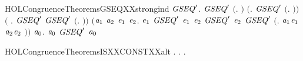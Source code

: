 \begin{SaveVerbatim}{HOLCongruenceTheoremsGSEQXXstrongind}
\HOLTokenTurnstile{} \HOLSymConst{\HOLTokenForall{}}\ensuremath{\HOLBoundVar{GSEQ}\sp{\prime}}.
       \ensuremath{\HOLBoundVar{GSEQ}\sp{\prime}} \ensuremath{(}\HOLTokenLambda{}. \ensuremath{)} \HOLSymConst{\HOLTokenConj{}} \ensuremath{(}\HOLSymConst{\HOLTokenForall{}}. \ensuremath{\HOLBoundVar{GSEQ}\sp{\prime}} \ensuremath{(}\HOLTokenLambda{}. \ensuremath{)}\ensuremath{)} \HOLSymConst{\HOLTokenConj{}}
       \ensuremath{(}\HOLSymConst{\HOLTokenForall{}} .   \HOLSymConst{\HOLTokenConj{}} \ensuremath{\HOLBoundVar{GSEQ}\sp{\prime}}  \HOLSymConst{\HOLTokenImp{}} \ensuremath{\HOLBoundVar{GSEQ}\sp{\prime}} \ensuremath{(}\HOLTokenLambda{}. \HOLSymConst{\ensuremath{\ldotp}} \ensuremath{)}\ensuremath{)} \HOLSymConst{\HOLTokenConj{}}
       \ensuremath{(}\HOLSymConst{\HOLTokenForall{}}\ensuremath{\HOLBoundVar{a}\sb{\mathrm{1}}} \ensuremath{\HOLBoundVar{a}\sb{\mathrm{2}}} \ensuremath{\HOLBoundVar{e}\sb{\mathrm{1}}} \ensuremath{\HOLBoundVar{e}\sb{\mathrm{2}}}.
             \ensuremath{\HOLBoundVar{e}\sb{\mathrm{1}}} \HOLSymConst{\HOLTokenConj{}} \ensuremath{\HOLBoundVar{GSEQ}\sp{\prime}} \ensuremath{\HOLBoundVar{e}\sb{\mathrm{1}}} \HOLSymConst{\HOLTokenConj{}}  \ensuremath{\HOLBoundVar{e}\sb{\mathrm{2}}} \HOLSymConst{\HOLTokenConj{}} \ensuremath{\HOLBoundVar{GSEQ}\sp{\prime}} \ensuremath{\HOLBoundVar{e}\sb{\mathrm{2}}} \HOLSymConst{\HOLTokenImp{}}
            \ensuremath{\HOLBoundVar{GSEQ}\sp{\prime}} \ensuremath{(}\HOLTokenLambda{}. \ensuremath{\HOLBoundVar{a}\sb{\mathrm{1}}}\HOLSymConst{\ensuremath{\ldotp}}\ensuremath{\HOLBoundVar{e}\sb{\mathrm{1}}}  \HOLSymConst{\ensuremath{+}} \ensuremath{\HOLBoundVar{a}\sb{\mathrm{2}}}\HOLSymConst{\ensuremath{\ldotp}}\ensuremath{\HOLBoundVar{e}\sb{\mathrm{2}}} \ensuremath{)}\ensuremath{)} \HOLSymConst{\HOLTokenImp{}}
       \HOLSymConst{\HOLTokenForall{}}\ensuremath{\HOLBoundVar{a}\sb{\mathrm{0}}}.  \ensuremath{\HOLBoundVar{a}\sb{\mathrm{0}}} \HOLSymConst{\HOLTokenImp{}} \ensuremath{\HOLBoundVar{GSEQ}\sp{\prime}} \ensuremath{\HOLBoundVar{a}\sb{\mathrm{0}}}
\end{SaveVerbatim}
\newcommand{\HOLCongruenceTheoremsGSEQXXstrongind}{\UseVerbatim{HOLCongruenceTheoremsGSEQXXstrongind}}
\begin{SaveVerbatim}{HOLCongruenceTheoremsISXXCONSTXXalt}
\HOLTokenTurnstile{} \HOLSymConst{\HOLTokenForall{}}.   \HOLSymConst{\HOLTokenEquiv{}} \HOLSymConst{\HOLTokenExists{}}. \HOLSymConst{\HOLTokenForall{}}.   \HOLSymConst{\ensuremath{=}} 
\end{SaveVerbatim}

